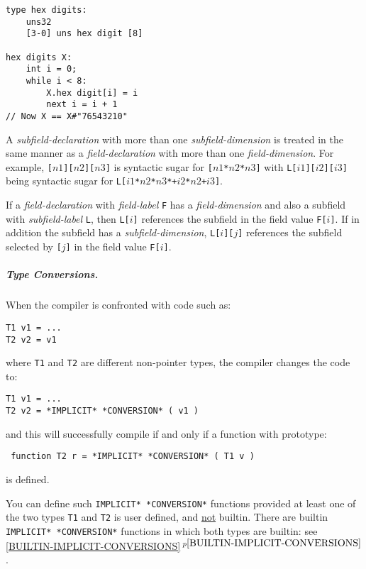\documentclass[12pt]{article}
\newcommand{\subsubsubsubsection}[1]{\subparagraph[#1]{#1.}}
\newcommand{\itemref}[1]{\ref{#1}$\,^{p\pageref{#1}}$}
\newcommand{\EOL}{\penalty \exhyphenpenalty}
\newenvironment{indpar}[1][0.3in]%
	{\begin{list}{}%
		     {\setlength{\itemsep}{0in}%
		      \setlength{\topsep}{0in}%
		      \setlength{\parsep}{1ex}%
		      \setlength{\labelwidth}{#1}%
		      \setlength{\leftmargin}{#1}%
		      \addtolength{\leftmargin}{\labelsep}}%
	 \item}%
	{\end{list}}
\begin{document}
\begin{indpar}\begin{verbatim}
type hex digits:
    uns32
    [3-0] uns hex digit [8]

hex digits X:
    int i = 0;
    while i < 8:
        X.hex digit[i] = i
        next i = i + 1
// Now X == X#"76543210"
\end{verbatim}\end{indpar}

A {\em subfield-declaration} with more than one {\em subfield-dimension} is
treated in the same manner as a {\em field-declaration} with
more than one {\em field-dimension}.  For example,
{\tt [$n1$][$n2$][$n3$]} is
syntactic sugar for {\tt [$n1$*$n2$*$n3$]} with
{\tt L[$i1$][$i2$][$i3$]} being syntactic sugar for
{\tt L[$i1$*$n2$*$n3$*+\EOL $i2$*$n2$+\EOL $i3$]}.

If a {\em field-declaration} with {\em field-label} {\tt F}
has a {\em field-dimension}
and also a subfield with {\em subfield-label} {\tt L}, then
{\tt L[$i$]} references the subfield in the field value {\tt F[$i$]}.
If in addition the subfield has a {\em subfield-dimension},
{\tt L[$i$][$j$]} references the subfield selected by {\tt [$j$]}
in the field value {\tt F[$i$]}.

\subsubsubsubsection{Type Conversions}
\label{TYPE-CONVERSIONS}

When the compiler is confronted with code such as:
\begin{indpar}\begin{verbatim}
T1 v1 = ...
T2 v2 = v1
\end{verbatim}\end{indpar}
where {\tt T1} and {\tt T2} are different non-pointer types,
the compiler changes the code to:
\begin{indpar}\begin{verbatim}
T1 v1 = ...
T2 v2 = *IMPLICIT* *CONVERSION* ( v1 )
\end{verbatim}\end{indpar}
and this will successfully compile if and only if a function
with prototype:
\begin{indpar} \tt
function T2 r = *IMPLICIT* *CONVERSION* ( T1 v )
\end{indpar}
is defined.

You can define such {\tt *IMPLICIT* *CONVERSION*} functions
provided at least one of the two types {\tt T1} and {\tt T2}
is user defined, and \underline{not} builtin.
There are builtin {\tt *IMPLICIT* *CON\-VER\-SION*} functions in
which both types are builtin: see \itemref{BUILTIN-IMPLICIT-CONVERSIONS}.
\end{document}
